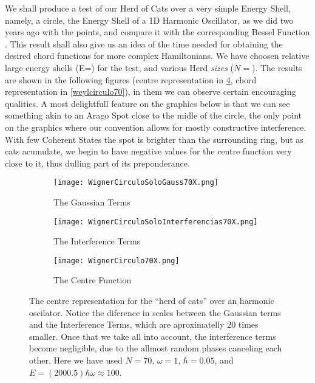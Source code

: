 \documentclass[a4paper,12pt]{article}
\begin{document}
We shall produce a  test of our Herd of Cats over a very simple
Energy Shell, namely, a circle, the Energy Shell of a 1D Harmonic Oscillator,
as we did two years ago with the points, and compare it with the corresponding
Bessel Function \cite{BerryRIR}. This result shall also give us an idea of the 
time needed for obtaining the desired chord functions for more complex
Hamiltonians. We have choosen relative large energy shells (E=) for the test,
and various Herd \emph{sizes} ($N=$). The results are shown in the
following figures (centre representation in \ref{wignercirculo70}, 
chord representation in \ref{weylcirculo70}), 
in them  we can observe certain encouraging 
qualities. A most delightfull feature on the graphics below is that we can
see something akin to an  Arago Spot \cite{Arago} 
close to the midle of the circle, the only point
on the graphics where our convention allows for mostly constructive 
interference. With few Coherent States the spot is brighter than the
surrounding ring, but as cats acumulate, we begin to have negative values
for the centre function very close to it, thus dulling part of its
preponderance. 


\begin{figure}[H]
  \centering
  \begin{subfigure}[b]{0.33\textwidth}
    \centering
          \texttt{[image: WignerCirculoSoloGauss70X.png]}
                \caption{The Gaussian Terms}
                \label{centrosgauss70}
  \end{subfigure}%
\begin{subfigure}[b]{0.33\textwidth}
    \centering
          \texttt{[image: WignerCirculoSoloInterferencias70X.png]}
                \caption{The Interference Terms}
                \label{centrosinter70}
  \end{subfigure}
  \begin{subfigure}[b]{0.33\textwidth}
    \centering
          \texttt{[image: WignerCirculo70X.png]}
                \caption{The Centre Function}
                \label{centrostodo70}
  \end{subfigure}%
\caption{ The centre representation for the ``herd of cats'' over an harmonic
oscilator. Notice the diference in scales between the Gaussian terms and
the Interference Terms, which are aproximatelly 20 times smaller. Once
that we take all into account, the interference terms become negligible, due to
the allmost random phases canceling each other. Here we have used $N=70$, $\omega=1$,
$\hbar=0.05$, and
$E=(2000.5) \hbar \omega \approx 100$.
 }\label{wignercirculo70}
\end{figure}
\end{document}
